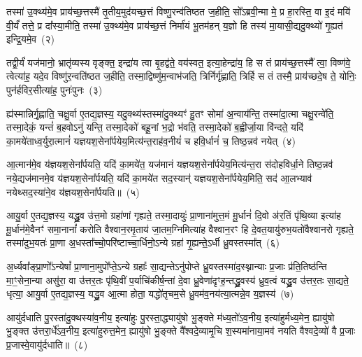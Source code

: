तस्मा॑ उ॒क्थ्य॑मे॒व प्राय॑च्छ॒त्तस्मै॑ तृ॒तीय॒मुद॑यच्छ॒त्तं विष्णु॒रन्व॑तिष्ठत ज॒हीति॒ सो᳚\-ऽब्रवी॒न्मा मे॒ प्र हा॒रस्ति॒ वा इ॒दं मयि॑ वी॒र्यं॑ तत्ते॒ प्र दा᳚स्या॒मीति॒ तस्मा॑ उ॒क्थ्य॑मे॒व प्राय॑च्छ॒त्तं निर्मा॑यं भू॒तम॑हन् य॒ज्ञो हि तस्य॑ मा॒यासी॒द्यदु॒क्थ्यो॑ गृ॒ह्यत॑ इन्द्रि॒यमे॒व~(२)\ip

तद्वी॒र्यं॑ यज॑मानो॒ भ्रातृ॑व्यस्य वृङ्क्त॒ इन्द्रा॑य त्वा बृ॒हद्व॑ते॒ वय॑स्वत॒ इत्या॒हेन्द्रा॑य॒ हि स तं प्राय॑च्छ॒त्तस्मै᳚ त्वा॒ विष्ण॑वे॒ त्वेत्या॑ह॒ यदे॒व विष्णु॑र॒न्वति॑ष्ठत ज॒हीति॒ तस्मा॒द्विष्णु॑म॒न्वाभ॑जति॒ त्रिर्निर्गृ॑ह्णाति॒ त्रिर्\mbox{}हि स तं तस्मै॒ प्राय॑च्छदे॒ष ते॒ योनिः॒ पुन॑र्\mbox{}हविर॒सीत्या॑ह॒ पुनः॑पुनः~(३)\ip

ह्य॑स्मान्निर्गृ॒ह्णाति॒ चक्षु॒र्वा ए॒तद्य॒ज्ञस्य॒ यदु॒क्थ्य॑स्तस्मा॑दु॒क्थ्यꣳ॑ हु॒तꣳ सोमा॑ अ॒न्वाय॑न्ति॒ तस्मा॑दा॒त्मा चक्षु॒रन्वे॑ति॒ तस्मा॒देकं॒ यन्तं॑ ब॒हवो\-ऽनु॑ यन्ति॒ तस्मा॒देको॑ बहू॒नां भ॒द्रो भ॑वति॒ तस्मा॒देको॑ ब॒ह्वीर्जा॒या वि॑न्दते॒ यदि॑ का॒मये॑ताध्व॒र्युरा॒त्मानं॑ यज्ञयश॒सेना᳚र्पयेय॒मित्य॑न्त॒राह॑व॒नीयं॑ च हवि॒र्धानं॑ च॒ तिष्ठ॒न्नव॑ नयेत्~(४)\ip

आ॒त्मान॑मे॒व य॑ज्ञयश॒सेना᳚र्पयति॒ यदि॑ का॒मये॑त॒ यज॑मानं यज्ञयश॒सेना᳚र्पयेय॒मित्य॑न्त॒रा स॑दोहविर्धा॒ने तिष्ठ॒न्नव॑ नये॒द्यज॑मानमे॒व य॑ज्ञयश॒सेना᳚र्पयति॒ यदि॑ का॒मये॑त सद॒स्यान्॑ यज्ञयश॒सेना᳚र्पयेय॒मिति॒ सद॑ आ॒लभ्याव॑ नयेथ्सद॒स्या॑ने॒व य॑ज्ञयश॒सेना᳚र्पयति॥~(५)\ip

{\anuvakamend[{इती᳚न्द्रि॒यमे॒व पुनः॑पुनर्नये॒त्त्रय॑स्त्रिꣳशच्च}]}

आयु॒र्वा ए॒तद्य॒ज्ञस्य॒ यद्ध्रु॒व उ॑त्त॒मो ग्रहा॑णां गृह्यते॒ तस्मा॒दायुः॑ प्रा॒णाना॑मुत्त॒मं मू॒र्धानं॑ दि॒वो अ॑र॒तिं पृ॑थि॒व्या इत्या॑ह मू॒र्धान॑मे॒वैनꣳ॑ समा॒नानां᳚ करोति वैश्वान॒रमृ॒ताय॑ जा॒तम॒ग्निमित्या॑ह वैश्वान॒रꣳ हि दे॒वत॒यायु॑रुभ॒यतो॑वैश्वानरो गृह्यते॒ तस्मा॑दुभ॒यतः॑ प्रा॒णा अ॒धस्ता᳚च्चो॒परि॑ष्टाच्चा॒र्धिनो॒\-ऽन्ये ग्रहा॑ गृ॒ह्यन्ते॒\-ऽर्धी ध्रु॒वस्तस्मा᳚त्~(६)\ip

अ॒र्ध्यवा᳚ङ्प्रा॒णो᳚\-ऽन्येषां᳚ प्रा॒णाना॒मुपो᳚प्ते॒\-ऽन्ये ग्रहाः᳚ सा॒द्यन्ते\-ऽनु॑पोप्ते ध्रु॒वस्तस्मा॑द॒स्थ्नान्याः प्र॒जाः प्र॑ति॒तिष्ठ॑न्ति मा॒ꣳ॒सेना॒न्या असु॑रा॒ वा उ॑त्तर॒तः पृ॑थि॒वीं प॒र्याचि॑कीर्\mbox{}ष॒न्तां दे॒वा ध्रु॒वेणा॑दृꣳह॒न्तद्ध्रु॒वस्य॑ ध्रुव॒त्वं यद्ध्रु॒व उ॑त्तर॒तः सा॒द्यते॒ धृत्या॒ आयु॒र्वा ए॒तद्य॒ज्ञस्य॒ यद्ध्रु॒व आ॒त्मा होता॒ यद्धो॑तृचम॒से ध्रु॒वम॑व॒नय॑त्या॒त्मन्ने॒व य॒ज्ञस्य॑~(७)\ip

आयु॑र्दधाति पु॒रस्ता॑दु॒क्थस्या॑व॒नीय॒ इत्या॑हुः पु॒रस्ता॒द्ध्यायु॑षो भु॒ङ्क्ते म॑ध्य॒तो॑\-ऽव॒नीय॒ इत्या॑हुर्मध्य॒मेन॒ ह्यायु॑षो भु॒ङ्क्त उ॑त्तरा॒र्धे॑\-ऽव॒नीय॒ इत्या॑हुरुत्त॒मेन॒ ह्यायु॑षो भु॒ङ्क्ते वै᳚श्वदे॒व्यामृ॒चि श॒स्यमा॑नाया॒मव॑ नयति वैश्वदे॒व्यो॑ वै प्र॒जाः प्र॒जास्वे॒वायु॑र्दधाति॥~(८)\ip


